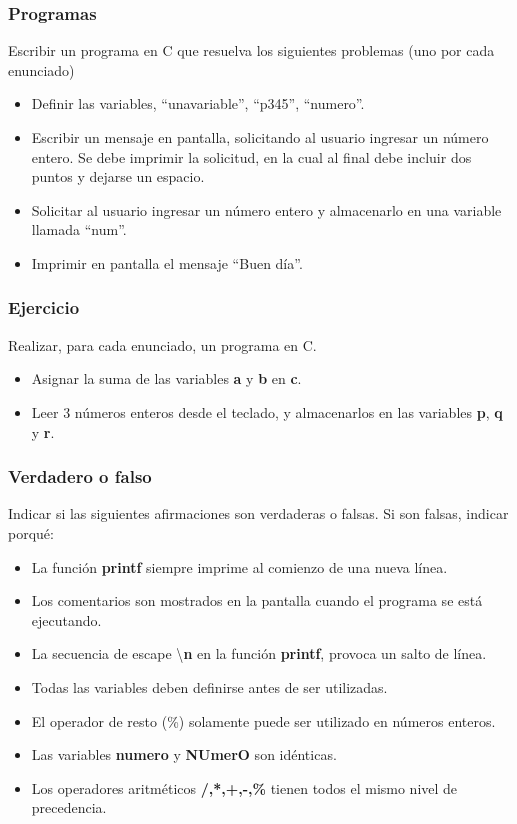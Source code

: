 \subsubsection{Programas}
Escribir un programa en C que resuelva los siguientes problemas (uno por cada enunciado)
\begin{itemize}
  \item Definir las variables, ``unavariable'', ``p345'', ``numero''.
  \item Escribir un mensaje en pantalla, solicitando al usuario ingresar un número entero. Se debe imprimir la
    solicitud, en la cual al final debe incluir dos puntos y dejarse un espacio.
  \item Solicitar al usuario ingresar un número entero y almacenarlo en una variable llamada ``num''.
  \item Imprimir en pantalla el mensaje ``Buen día''.
\end{itemize}

\subsubsection{Ejercicio}
Realizar, para cada enunciado, un programa en C.
\begin{itemize}
  \item Asignar la suma de las variables \textbf{a} y \textbf{b} en \textbf{c}.
  \item Leer 3 números enteros desde el teclado, y almacenarlos en las variables \textbf{p}, \textbf{q} y \textbf{r}.
\end{itemize}

\subsubsection{Verdadero o falso}
Indicar si las siguientes afirmaciones son verdaderas o falsas. Si son falsas, indicar porqué:
\begin{itemize}
  \item La función \textbf{printf} siempre imprime al comienzo de una nueva línea.
  \item Los comentarios son mostrados en la pantalla cuando el programa se está ejecutando.
  \item La secuencia de escape \textbackslash \textbf{n} en la función \textbf{printf}, provoca un salto de línea.
  \item Todas las variables deben definirse antes de ser utilizadas.
  \item El operador de resto (\%) solamente puede ser utilizado en números enteros.
  \item Las variables \textbf{numero} y \textbf{NUmerO} son idénticas.
  \item Los operadores aritméticos \textbf{/,*,+,-,\%} tienen todos el mismo nivel de precedencia.
\end{itemize}

